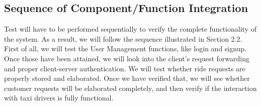 \subsection{Sequence of Component/Function Integration}
Test will have to be performed sequentially to verify the complete functionality of the system.
As a result, we will follow the sequence illustrated in Section 2.2. First of all, we will test the User Management functions, like login and signup. Once those have been
attained, we will look into the client's request forwarding and proper client-server authentication. We will test whether ride requests are properly stored and elaborated. 
Once we have verified that, we will see whether customer requests will be elaborated completely, and then verify if the interaction with taxi drivers is fully functional.
